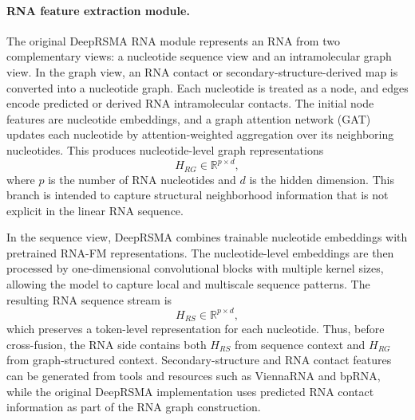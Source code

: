 ﻿\documentclass[journal=jcisd8,manuscript=article]{achemso}
\begin{document}
\paragraph{RNA feature extraction module.}
The original DeepRSMA RNA module represents an RNA from two complementary views: a nucleotide sequence view and an intramolecular graph view. In the graph view, an RNA contact or secondary-structure-derived map is converted into a nucleotide graph. Each nucleotide is treated as a node, and edges encode predicted or derived RNA intramolecular contacts. The initial node features are nucleotide embeddings, and a graph attention network (GAT) updates each nucleotide by attention-weighted aggregation over its neighboring nucleotides.\cite{Velickovic2017GAT} This produces nucleotide-level graph representations
\begin{equation}
H_{RG} \in \mathbb{R}^{p \times d},
\end{equation}
where $p$ is the number of RNA nucleotides and $d$ is the hidden dimension. This branch is intended to capture structural neighborhood information that is not explicit in the linear RNA sequence.

In the sequence view, DeepRSMA combines trainable nucleotide embeddings with pretrained RNA-FM representations.\cite{Chen2022RNAFM} The nucleotide-level embeddings are then processed by one-dimensional convolutional blocks with multiple kernel sizes, allowing the model to capture local and multiscale sequence patterns. The resulting RNA sequence stream is
\begin{equation}
H_{RS} \in \mathbb{R}^{p \times d},
\end{equation}
which preserves a token-level representation for each nucleotide. Thus, before cross-fusion, the RNA side contains both $H_{RS}$ from sequence context and $H_{RG}$ from graph-structured context. Secondary-structure and RNA contact features can be generated from tools and resources such as ViennaRNA and bpRNA, while the original DeepRSMA implementation uses predicted RNA contact information as part of the RNA graph construction.\cite{Lorenz2011ViennaRNA,Danaee2018bpRNA,Huang2024DeepRSMA}
\end{document}
